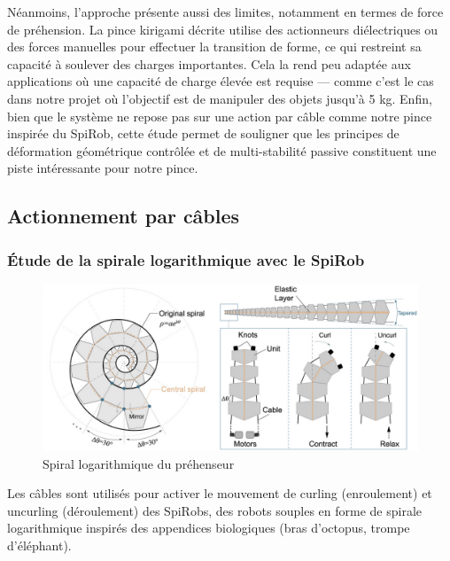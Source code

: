 \documentclass[a4paper, 11pt]{report}
\begin{document}
            Néanmoins, l’approche présente aussi des limites, notamment en termes de force de préhension. La pince kirigami décrite utilise des actionneurs diélectriques ou des forces manuelles pour effectuer la transition de forme, ce qui restreint sa capacité à soulever des charges importantes. Cela la rend peu adaptée aux applications où une capacité de charge élevée est requise — comme c’est le cas dans notre projet où l’objectif est de manipuler des objets jusqu’à 5 kg. Enfin, bien que le système ne repose pas sur une action par câble comme notre pince inspirée du SpiRob, cette étude permet de souligner que les principes de déformation géométrique contrôlée et de multi-stabilité passive constituent une piste intéressante pour notre pince.
    
        \subsection{Actionnement par câbles}
    
        \subsubsection{Étude de la spirale logarithmique avec le SpiRob}
        
            \begin{figure}
                \centering
                \includegraphics[width=1.0\textwidth]{Figures/spiral_logarithm.png}
                \caption{Spiral logarithmique du préhenseur \cite{wang_spirobs_2025}}
                \label{fig:spiral_logarithm}
            \end{figure}
    
            Les câbles sont utilisés pour activer le mouvement de curling (enroulement) et uncurling (déroulement) des SpiRobs, des robots souples en forme de spirale logarithmique inspirés des appendices biologiques (bras d'octopus, trompe d'éléphant).
\end{document}
